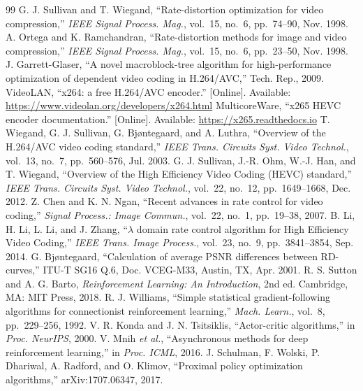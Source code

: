 \documentclass[conference]{IEEEtran}
\begin{document}
\begin{thebibliography}{99}\footnotesize
{} G. J. Sullivan and T. Wiegand, ``Rate-distortion optimization for video compression,'' \emph{IEEE Signal Process. Mag.}, vol.~15, no.~6, pp.~74--90, Nov. 1998.
 A. Ortega and K. Ramchandran, ``Rate-distortion methods for image and video compression,'' \emph{IEEE Signal Process. Mag.}, vol.~15, no.~6, pp.~23--50, Nov. 1998.
 J. Garrett-Glaser, ``A novel macroblock-tree algorithm for high-performance optimization of dependent video coding in H.264/AVC,'' Tech. Rep., 2009.
 VideoLAN, ``x264: a free H.264/AVC encoder.'' [Online]. Available: \url{https://www.videolan.org/developers/x264.html}
 MulticoreWare, ``x265 HEVC encoder documentation.'' [Online]. Available: \url{https://x265.readthedocs.io}
 T. Wiegand, G. J. Sullivan, G. Bj{\o}ntegaard, and A. Luthra, ``Overview of the H.264/AVC video coding standard,'' \emph{IEEE Trans. Circuits Syst. Video Technol.}, vol.~13, no.~7, pp.~560--576, Jul. 2003.
 G. J. Sullivan, J.-R. Ohm, W.-J. Han, and T. Wiegand, ``Overview of the High Efficiency Video Coding (HEVC) standard,'' \emph{IEEE Trans. Circuits Syst. Video Technol.}, vol.~22, no.~12, pp.~1649--1668, Dec. 2012.
 Z. Chen and K. N. Ngan, ``Recent advances in rate control for video coding,'' \emph{Signal Process.: Image Commun.}, vol.~22, no.~1, pp.~19--38, 2007.
 B. Li, H. Li, L. Li, and J. Zhang, ``$\lambda$ domain rate control algorithm for High Efficiency Video Coding,'' \emph{IEEE Trans. Image Process.}, vol.~23, no.~9, pp.~3841--3854, Sep. 2014.
 G. Bj{\o}ntegaard, ``Calculation of average PSNR differences between RD-curves,'' ITU-T SG16 Q.6, Doc. VCEG-M33, Austin, TX, Apr. 2001.
 R. S. Sutton and A. G. Barto, \emph{Reinforcement Learning: An Introduction}, 2nd ed. Cambridge, MA: MIT Press, 2018.
 R. J. Williams, ``Simple statistical gradient-following algorithms for connectionist reinforcement learning,'' \emph{Mach. Learn.}, vol.~8, pp.~229--256, 1992.
 V. R. Konda and J. N. Tsitsiklis, ``Actor-critic algorithms,'' in \emph{Proc. NeurIPS}, 2000.
 V. Mnih \emph{et al.}, ``Asynchronous methods for deep reinforcement learning,'' in \emph{Proc. ICML}, 2016.
 J. Schulman, F. Wolski, P. Dhariwal, A. Radford, and O. Klimov, ``Proximal policy optimization algorithms,'' arXiv:1707.06347, 2017.

\end{thebibliography}
\end{document}

